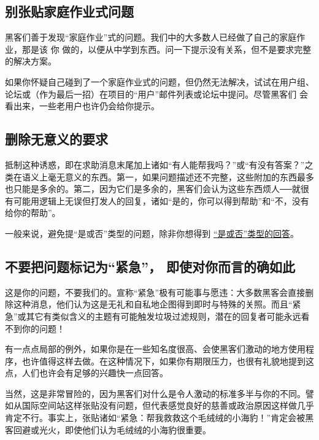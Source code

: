 \subsection{别张贴家庭作业式问题}


黑客们善于发现“家庭作业”式的问题。我们中的大多数人已经做了自己的家庭作业，那是该 你 做的，以便从中学到东西。问一下提示没有关系，但不是要求完整的解决方案。

如果你怀疑自己碰到了一个家庭作业式的问题，但仍然无法解决，试试在用户组、论坛或（作为最后一招）在项目的“用户”邮件列表或论坛中提问。尽管黑客们 会 看出来，一些老用户也许仍会给你提示。





\subsection{删除无意义的要求}

抵制这种诱惑，即在求助消息末尾加上诸如“有人能帮我吗？”或“有没有答案？”之类在语义上毫无意义的东西。第一，如果问题描述还不完整，这些附加的东西最多也只能是多余的。第二，因为它们是多余的，黑客们会认为这些东西烦人──就很有可能用逻辑上无误但打发人的回复，诸如“是的，你可以得到帮助”和“不，没有给你的帮助”。

一般来说，避免提“是或否”类型的问题，除非你想得到 \href{http://homepage.ntlworld.com./jonathan.deboynepollard/FGA/questions-with-yes-or-no-answers.html}{“是或否”类型的回答}。





\subsection{不要把问题标记为“紧急”， 即使对你而言的确如此}

这是你的问题，不要我们的。宣称“紧急”极有可能事与愿违：大多数黑客会直接删除这种消息，他们认为这是无礼和自私地企图得到即时与特殊的关照。而且“紧急”或其它有类似含义的主题有可能触发垃圾过滤规则，潜在的回复者可能永远看不到你的问题！

有一点点局部的例外，如果你是在一些知名度很高、会使黑客们激动的地方使用程序，也许值得这样去做。在这种情况下，如果你有期限压力，也很有礼貌地提到这点，人们也许会有足够的兴趣快一点回答。

当然，这是非常冒险的，因为黑客们对什么是令人激动的标准多半与你的不同。譬如从国际空间站这样张贴没有问题，但代表感觉良好的慈善或政治原因这样做几乎肯定不行。事实上，张贴诸如“紧急：帮我救救这个毛绒绒的小海豹！”肯定会被黑客回避或光火，即使他们认为毛绒绒的小海豹很重要。

